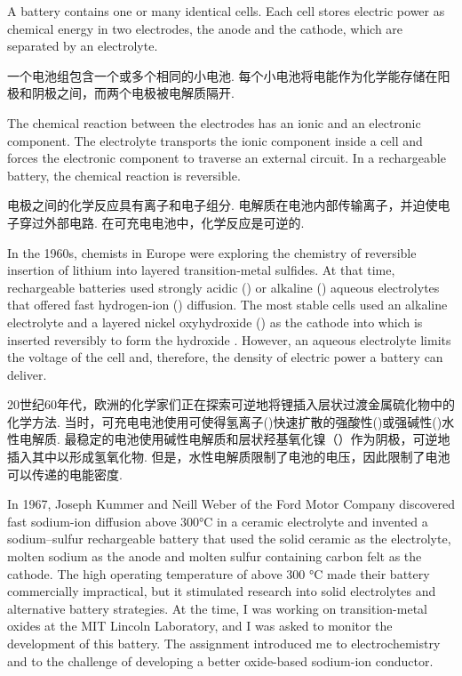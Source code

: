 \begin{multicols}{2}



A battery contains one or many identical cells. Each cell stores electric power as chemical energy in two electrodes, the anode and the cathode, which are separated by an electrolyte.

一个电池组包含一个或多个相同的小电池. 每个小电池将电能作为化学能存储在阳极和阴极之间，而两个电极被电解质隔开. 

The chemical reaction between the electrodes has an ionic and an electronic component. The electrolyte transports the ionic component inside a cell and forces the electronic component to traverse an external circuit. In a rechargeable battery, the chemical reaction is reversible. 

电极之间的化学反应具有离子和电子组分. 电解质在电池内部传输离子，并迫使电子穿过外部电路. 在可充电电池中，化学反应是可逆的. 

In the 1960s, chemists in Europe were exploring the chemistry of reversible insertion of lithium into layered transition-metal sulfides. At that time, rechargeable batteries used strongly acidic () or alkaline () aqueous electrolytes that offered fast hydrogen-ion () diffusion. The most stable cells used an alkaline electrolyte and a layered nickel oxyhydroxide () as the cathode into which  is inserted reversibly to form the hydroxide . However, an aqueous electrolyte limits the voltage of the cell and, therefore, the density of electric power a battery can deliver. 

20世纪60年代，欧洲的化学家们正在探索可逆地将锂插入层状过渡金属硫化物中的化学方法. 当时，可充电电池使用可使得氢离子()快速扩散的强酸性()或强碱性()水性电解质. 最稳定的电池使用碱性电解质和层状羟基氧化镍（）作为阴极，可逆地插入其中以形成氢氧化物. 但是，水性电解质限制了电池的电压，因此限制了电池可以传递的电能密度. 

In 1967, Joseph Kummer and Neill Weber of the Ford Motor Company discovered fast sodium-ion diffusion above 300°C in a ceramic electrolyte and invented a sodium–sulfur rechargeable battery that used the solid ceramic as the electrolyte, molten sodium as the anode and molten sulfur containing carbon felt as the cathode. The high operating temperature of above 300 °C made their battery commercially impractical, but it stimulated research into solid electrolytes and alternative battery strategies. At the time, I was working on transition-metal oxides at the MIT Lincoln Laboratory, and I was asked to monitor the development of this battery. The assignment introduced me to electrochemistry and to the challenge of developing a better oxide-based sodium-ion conductor.


\end{multicols}
